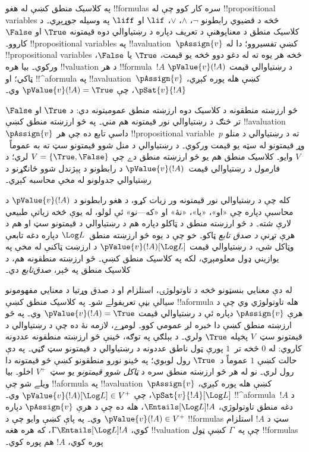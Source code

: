 \documentclass[../../../include/open-logic-section]{subfiles}
\begin{document}


په کلاسيک منطق کښې له هغو !!{formula}s سره کار
کوو چې له !!{propositional variable}s څخه د
قضيوي رابطونو $\lnot$، $\land$، $\lor$، $\lif$
او $\liff$ په وسيله جوړېږي۔ د کلاسيک منطق د
معناپوهنې د تعريف دپاره د رښتياوالي دوه قيمتونه $\True$
او $\False$ کاروو۔ !!{propositional variable}s
په !!a{valuation}~$\pAssign{v}$ کښې تفسيروو؛
دا له !!{propositional variable}s څخه هر يوه ته له دغو دوو څخه يو قيمت،
$\True$ يا $\False$، ورکوي۔ بيا هره
!!{valuation} د هر !!{formula}~$!A$ د رښتياوالي
قيمت $\pValue{v}(!A)$ ټاکي؛ او !!^a{formula}
په !!a{valuation}~$\pAssign{v}$ کښې هله پوره
کېږي، $\pSat{v}{!A}$، چې $\pValue{v}(!A) =
\True$ وي۔

څو ارزښته منطقونه د کلاسيک دوه ارزښته منطق
عموميتونه دي: د $\True$ او $\False$ تر څنګ
د رښتياوالي نور قيمتونه هم مني۔ په څو ارزښته منطق کښې
!!a{valuation}~$\pAssign{v}$ داسې تابع ده چې
هر !!{propositional variable}~$p$ ته د رښتياوالي
د منلو وړ قيمتونو له سټه يو قيمت ورکوي۔
د رښتياوالي د منل شوو قيمتونو سټ ته به عموماً~$V$
وايو۔ کلاسيک منطق هم يو څو ارزښته منطق دے چې
$V = \{\True, \False\}$ لري؛ د فارمول د رښتياوالي
قيمت~$\pValue{v}(!A)$ د رابطونو د پېژندل شوو
ځانګړنو د رښتياوالي جدولونو له مخې محاسبه کېږي۔

کله چې د رښتياوالي نور قيمتونه ور زيات کړو، د هغو
رابطونو د $\pValue{v}(!A)$ د محاسبې دپاره چې
«او»، «يا»، «نۀ» او «که---نو» ئې لولو، له يوې
څخه زياتې طبيعي لارې شته۔ د څو ارزښته منطق د ټاکلو دپاره
هم د رښتياوالي د قيمتونو سټ او هم د هرې تړنې \emph{د صدق تابع}
ټاکو۔
خو چې د يوه څو ارزښته منطق~$\Log L$ دپاره دغه
تابعې وټاکل شي، د رښتياوالي قيمت
$\pValue{v}(!A)[\Log L]$ د ارزښت ټاکنې له مخې
په يوازيني ډول معلومېږي، لکه په کلاسيک منطق کښې۔
څو ارزښته منطقونه هم، د کلاسيک منطق په څېر،
\emph{صدق‌تابع} دي۔

له دې معنايي بنسټونو څخه د تاوتولوژۍ،
استلزام او د صدق وړتيا د معنايي مفهومونو سيالې
بڼې تعريفولے شو۔ په کلاسيک منطق کښې
!!a{formula} هله تاوتولوژي وي چې د هرې
$\pAssign{v}$ دپاره ئې د رښتياوالي قيمت
$\pValue{v}(!A) = \True$ وي۔ په څو ارزښته
منطق کښې دا خبره لږ عمومي کوو۔ لومړے، لازمه نۀ
ده چې د رښتياوالي د قيمتونو سټ~$V$ پخپله $\True$
ولري۔ د بېلګې په توګه، ځينې څو ارزښته منطقونه
عددونه کاروي: له $0$ څخه تر~$1$ پورې ټول ناطق
عددونه د رښتياوالي د قيمتونو سټ ګڼي۔ په دې حالت کښې
$1$ عموماً د~$\True$ رول لوبوي؛ په ځينو نورو
منطقونو کښې څو قيمتونه دا رول لري۔ نو له هر څو
ارزښته منطق سره د \emph{ټاکل شوو قيمتونو} يو سټ~$V^+$ اخلو۔ بيا ويلے شو چې
!!a{formula} په !!a{valuation}~$\pAssign{v}$
کښې هله پوره کېږي، $\pSat{v}{!A}[\Log L]$،
چې $\pValue{v}(!A)[\Log L] \in V^+$ وي۔
!!^a{formula}~$!A$ د دغه منطق تاوتولوژي،
$\Entails[\Log L] !A$، هله ده چې د هرې
$\pAssign{v}$ دپاره $\pValue{v}(!A) \in V^+$
وي۔ په پاې کښې وايو چې د !!{formula}s سټ
د $!A$ استلزام کوي، $\Gamma \Entails[\Log L] !A$،
که هره هغه !!{valuation} چې په~$\Gamma$ کښې
ټول !!{formula}s پوره کوي، $!A$ هم پوره کوي۔
\end{document}
